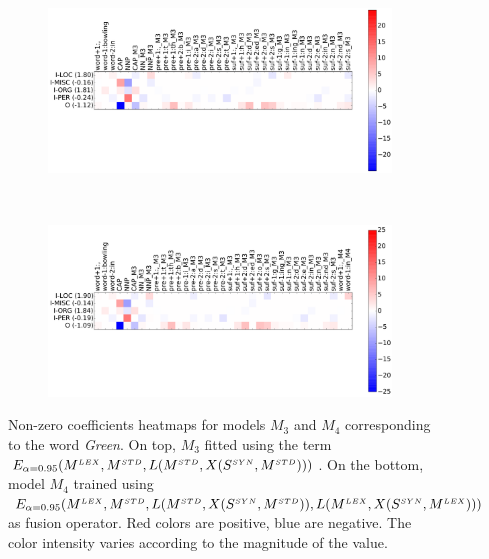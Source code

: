 \begin{figure}[h!]
	\centering
	\begin{subfigure}[t]{.9\textwidth}
	\centering
	\captionsetup{width=\textwidth}
	\includegraphics[width=1\linewidth]{images/Chapitre4/M3_16029.pdf}
	\label{fig:trans_M33}
	\end{subfigure}\\%
	\begin{subfigure}[t]{.9\textwidth}
	\centering
	\captionsetup{width=\textwidth}	
	\includegraphics[width=1\linewidth]{images/Chapitre4/M4_16029.pdf}
	\label{fig:trans_M4}
	\end{subfigure}
	\caption{Non-zero coefficients heatmaps for  models $M_3$ and $M_4$ corresponding to the word \textit{Green}. On top, $M_3$ fitted using the term $E_{\alpha=0.95}(M^{\scriptscriptstyle LEX}, M^{\scriptscriptstyle STD}, L(M^{\scriptscriptstyle STD}, X(S^{\scriptscriptstyle SYN}, M^{\scriptscriptstyle STD})))$. On the bottom, model $M_4$ trained using   $E_{\alpha=0.95}(M^{\scriptscriptstyle LEX}, M^{\scriptscriptstyle STD}, L(M^{\scriptscriptstyle STD}, X(S^{\scriptscriptstyle SYN}, M^{\scriptscriptstyle STD})), L(M^{\scriptscriptstyle LEX}, X(S^{\scriptscriptstyle SYN}, M^{\scriptscriptstyle LEX})))$ as fusion operator. Red colors are positive, blue are negative. The color intensity varies according to the magnitude of the value.}
	\label{fig:trans_M3_M4}
\end{figure}

